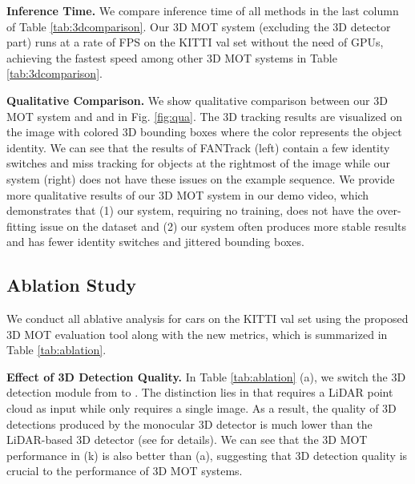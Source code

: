 \documentclass[letterpaper, 10 pt, conference]{ieeeconf}
\begin{document}
\vspace{1.5mm}\noindent\textbf{Inference Time.} We compare inference time of all methods in the last column of Table \ref{tab:3dcomparison}. Our 3D MOT system (excluding the 3D detector part) runs at a rate of  FPS on the KITTI val set without the need of GPUs, achieving the fastest speed among other 3D MOT systems in Table \ref{tab:3dcomparison}.

\vspace{1.5mm}\noindent\textbf{Qualitative Comparison.} We show qualitative comparison between our 3D MOT system and \cite{Baser2019} and in Fig. \ref{fig:qua}. The 3D tracking results are visualized on the image with colored 3D bounding boxes where the color represents the object identity. We can see that the results of FANTrack (left) contain a few identity switches and miss tracking for objects at the rightmost of the image while our system (right) does not have these issues on the example sequence. We provide more qualitative results of our 3D MOT system in our demo video, which demonstrates that (1) our system, requiring no training, does not have the over-fitting issue on the dataset and (2) our system often produces more stable results and has fewer identity switches and jittered bounding boxes.



\vspace{-0.05cm}
\subsection{Ablation Study}

We conduct all ablative analysis for cars on the KITTI val set using the proposed 3D MOT evaluation tool along with the new metrics, which is summarized in Table \ref{tab:ablation}.

\vspace{1.5mm}\noindent\textbf{Effect of 3D Detection Quality.} In Table \ref{tab:ablation} (a), we switch the 3D detection module from \cite{Shi2019} to \cite{Weng2019}. The distinction lies in that \cite{Shi2019} requires a LiDAR point cloud as input while \cite{Weng2019} only requires a single image. As a result, the quality of 3D detections produced by the monocular 3D detector \cite{Weng2019} is much lower than the LiDAR-based 3D detector \cite{Shi2019} (see \cite{Shi2019, Weng2019} for details). We can see that the 3D MOT performance in (k) is also better than (a), suggesting that 3D detection quality is crucial to the performance of 3D MOT systems.
\end{document}
